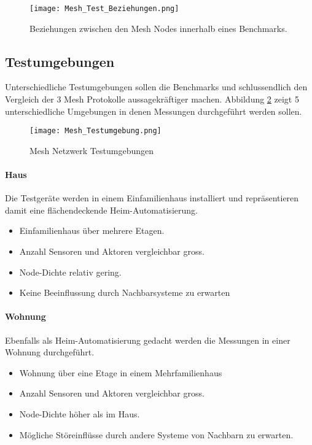 \begin{figure}[H]
	\centering
	\texttt{[image: Mesh\_Test\_Beziehungen.png]}
	\caption{Beziehungen zwischen den Mesh Nodes innerhalb eines Benchmarks.}\label{fig:MeshTestBeziehungen}
\end{figure}


\subsection{Testumgebungen}\label{subsec:Testumgebungen}

Unterschiedliche Testumgebungen sollen die Benchmarks und schlussendlich den Vergleich der 3 Mesh Protokolle aussagekräftiger machen. Abbildung \ref{fig:MeshNetzwerkTestumgebungen} zeigt 5 unterschiedliche Umgebungen in denen Messungen durchgeführt werden sollen.

\begin{figure}[H]
	\centering
	\texttt{[image: Mesh\_Testumgebung.png]}
	\caption{Mesh Netzwerk Testumgebungen}\label{fig:MeshNetzwerkTestumgebungen}
\end{figure}


\paragraph{Haus}
Die Testgeräte werden in einem Einfamilienhaus installiert und repräsentieren damit eine flächendeckende Heim-Automatisierung.
	\begin{itemize}
		\item Einfamilienhaus über mehrere Etagen.
		\item Anzahl Sensoren und Aktoren vergleichbar gross.
		\item Node-Dichte relativ gering.
		\item Keine Beeinflussung durch Nachbarsysteme zu erwarten
	\end{itemize}
	
\paragraph{Wohnung}
Ebenfalls als Heim-Automatisierung gedacht werden die Messungen in einer Wohnung durchgeführt.
	\begin{itemize}
		\item Wohnung über eine Etage in einem Mehrfamilienhaus
		\item Anzahl Sensoren und Aktoren vergleichbar gross.
		\item Node-Dichte höher als im Haus.
		\item Mögliche Störeinflüsse durch andere Systeme von Nachbarn zu 					erwarten.
	\end{itemize}
	

